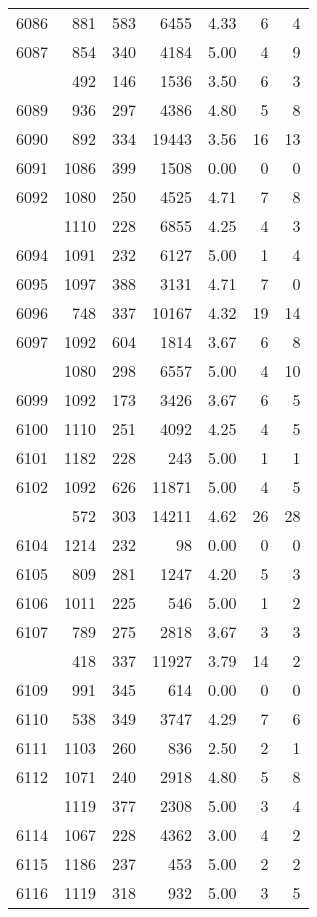 \documentclass[
]{article}
\begin{document}
\begin{table}
\begin{tabular}[t]{lrrrrrr}
6086 & 881 & 583 & 6455 & 4.33 & 6 & 4\\
6087 & 854 & 340 & 4184 & 5.00 & 4 & 9\\
\addlinespace
6088 & 492 & 146 & 1536 & 3.50 & 6 & 3\\
6089 & 936 & 297 & 4386 & 4.80 & 5 & 8\\
6090 & 892 & 334 & 19443 & 3.56 & 16 & 13\\
6091 & 1086 & 399 & 1508 & 0.00 & 0 & 0\\
6092 & 1080 & 250 & 4525 & 4.71 & 7 & 8\\
\addlinespace
6093 & 1110 & 228 & 6855 & 4.25 & 4 & 3\\
6094 & 1091 & 232 & 6127 & 5.00 & 1 & 4\\
6095 & 1097 & 388 & 3131 & 4.71 & 7 & 0\\
6096 & 748 & 337 & 10167 & 4.32 & 19 & 14\\
6097 & 1092 & 604 & 1814 & 3.67 & 6 & 8\\
\addlinespace
6098 & 1080 & 298 & 6557 & 5.00 & 4 & 10\\
6099 & 1092 & 173 & 3426 & 3.67 & 6 & 5\\
6100 & 1110 & 251 & 4092 & 4.25 & 4 & 5\\
6101 & 1182 & 228 & 243 & 5.00 & 1 & 1\\
6102 & 1092 & 626 & 11871 & 5.00 & 4 & 5\\
\addlinespace
6103 & 572 & 303 & 14211 & 4.62 & 26 & 28\\
6104 & 1214 & 232 & 98 & 0.00 & 0 & 0\\
6105 & 809 & 281 & 1247 & 4.20 & 5 & 3\\
6106 & 1011 & 225 & 546 & 5.00 & 1 & 2\\
6107 & 789 & 275 & 2818 & 3.67 & 3 & 3\\
\addlinespace
6108 & 418 & 337 & 11927 & 3.79 & 14 & 2\\
6109 & 991 & 345 & 614 & 0.00 & 0 & 0\\
6110 & 538 & 349 & 3747 & 4.29 & 7 & 6\\
6111 & 1103 & 260 & 836 & 2.50 & 2 & 1\\
6112 & 1071 & 240 & 2918 & 4.80 & 5 & 8\\
\addlinespace
6113 & 1119 & 377 & 2308 & 5.00 & 3 & 4\\
6114 & 1067 & 228 & 4362 & 3.00 & 4 & 2\\
6115 & 1186 & 237 & 453 & 5.00 & 2 & 2\\
6116 & 1119 & 318 & 932 & 5.00 & 3 & 5\\

\end{tabular}
\end{table}
\end{document}
